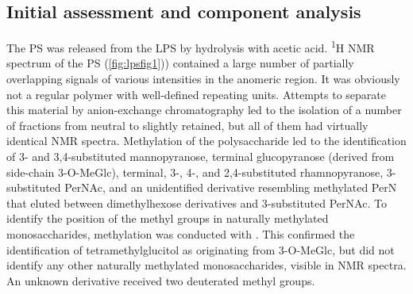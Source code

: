 	\subsection{Initial assessment and component analysis} %
	\label{sub:initial_assessment_and_component_analysis}

  The \ac{PS} was released from the \ac{LPS} by hydrolysis with acetic acid. \textsuperscript{1}H
  \ac{NMR} spectrum of the \ac{PS} (\cref{fig:lpsfig1})) contained a large number of partially
  overlapping signals of various intensities in the anomeric region. It was obviously not a regular
  polymer with well-defined repeating units. Attempts to separate this material by anion-exchange
  chromatography led to the isolation of a number of fractions from neutral to slightly retained,
  but all of them had virtually identical \ac{NMR} spectra. Methylation of the polysaccharide led to
  the identification of 3- and 3,4-substituted mannopyranose, terminal glucopyranose (derived from
  side-chain 3-O-MeGlc), terminal, 3-, 4-, and 2,4-substituted rhamnopyranose, 3-substituted PerNAc,
  and an unidentified derivative resembling methylated PerN that eluted between dimethylhexose
  derivatives and 3-substituted PerNAc. To identify the position of the methyl groups in naturally
  methylated monosaccharides, methylation was conducted with . This confirmed the
  identification of tetramethylglucitol as originating from 3-O-MeGlc, but did not identify any
  other naturally methylated monosaccharides, visible in \ac{NMR} spectra. An unknown derivative
  received two deuterated methyl groups.

